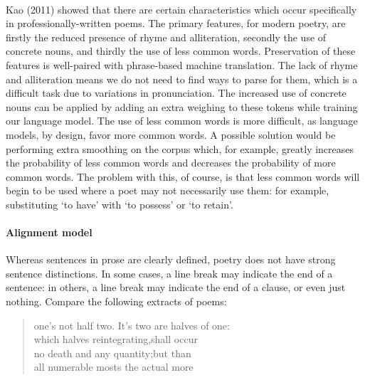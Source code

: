 \paragraph{}{Kao (2011) \cite{kao} showed that there are certain
  characteristics which occur specifically in professionally-written
  poems. The primary features, for modern poetry, are firstly the
  reduced presence of rhyme and alliteration, secondly the use of
  concrete nouns, and thirdly the use of less common
  words. Preservation of these features is well-paired with
  phrase-based machine translation. The lack of rhyme and alliteration
  means we do not need to find ways to parse for them, which is a
  difficult task due to variations in pronunciation. The increased use
  of concrete nouns can be applied by adding an extra weighing to
  these tokens while training our language model. The use of less
  common words is more difficult, as language models, by design, favor
  more common words. A possible solution would be performing extra
  smoothing on the corpus which, for example, greatly increases the
  probability of less common words and decreases the probability of
  more common words. The problem with this, of course, is that less
  common words will begin to be used where a poet may not necessarily
  use them: for example, substituting `to have' with `to possess' or
  `to retain'. }

\paragraph{Alignment model}{Whereas sentences in prose are clearly
  defined, poetry does not have strong sentence distinctions. In some
  cases, a line break may indicate the end of a sentence: in others, a
  line break may indicate the end of a clause, or even just
  nothing. Compare the following extracts of poems:\\}


\begin{minipage}{\linewidth}
  \begin{verse}
    one's not half two. It's two are halves of one: \\
    which halves reintegrating,shall occur \\
    no death and any quantity;but than \\
    all numerable mosts the actual more
  \end{verse}
\end{minipage}

